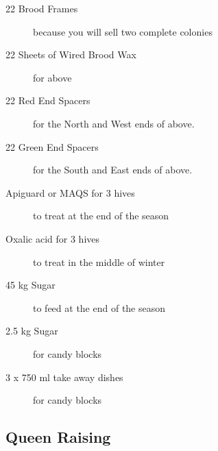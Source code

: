 \documentclass{./BeekeepingBook}
\begin{document}
\begin{description}
  \item[22 Brood Frames] because you will sell two complete colonies
  \item[22 Sheets of Wired Brood Wax] for above 
  \item[22 Red End Spacers] for the North and West ends of above.
  \item[22 Green End Spacers] for the South and East ends of above.
  \item[Apiguard or MAQS for 3 hives] to treat at the end of the season
  \item[Oxalic acid for 3 hives] to treat in the middle of winter
  \item[45 kg Sugar] to feed at the end of the season
  \item[2.5 kg Sugar] for candy blocks
  \item[3 x 750 ml take away dishes] for candy blocks
\end{description}

\subsection{Queen Raising}
\end{document}
